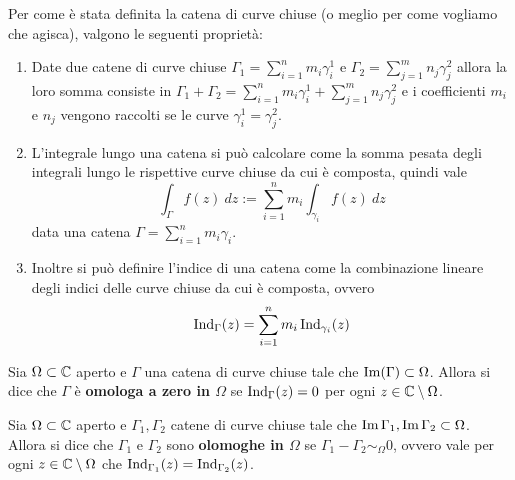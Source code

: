 \begin{remark}
  Per come è stata definita la catena di curve chiuse (o meglio per come vogliamo
  che agisca), valgono le seguenti proprietà:
  \begin{enumerate}
    \item Date due catene di curve chiuse $\Gamma_1 = \sum^n_{i=1} m_i
      \gamma^1_i$ e $\Gamma_2 = \sum^m_{j=1} n_j \gamma^2_j$ allora la loro
      somma consiste in $\Gamma_1 + \Gamma_2 =  \sum^n_{i=1} m_i
      \gamma^1_i + \sum^m_{j=1} n_j \gamma^2_j$ e i coefficienti $m_i$
      e $n_j$ vengono raccolti se le curve $\gamma^1_i = \gamma^2_j$.
    \item L'integrale lungo una catena si può calcolare come la somma pesata
      degli integrali lungo le rispettive curve chiuse da cui è composta,
      quindi vale 
      \begin{equation*}
        \int_\Gamma f(z)\ dz := \sum^n_{i=1} m_i \int_{\gamma_i} f(z)\ dz
      \end{equation*}
      data una catena $\Gamma = \sum^n_{i=1} m_i\gamma_i$.
    \item Inoltre si può definire l'indice di una catena come la
      combinazione lineare degli indici delle curve chiuse da cui
      è composta, ovvero 
      \begin{equation*}
        \operatorname{Ind}_\Gamma(z) = \sum^n_{i=1} m_i
        \operatorname{Ind}_{\gamma_i}(z)
      \end{equation*}
  \end{enumerate}
  \label{rmk:operazioni-intuitive-per-le-catene-di-curve-chiuse}
\end{remark}


\begin{definition}
  \label{def:omologia-a-zero}
  Sia $\Omega \subset \mathbb{C}$ aperto e $\Gamma$ una catena di curve chiuse tale
  che $\operatorname{Im}(\Gamma) \subset \Omega$. Allora si dice che $\Gamma$
  è \textbf{omologa a zero in $\Omega$} se $\operatorname{Ind}_\Gamma(z)
  = 0$ per ogni $z \in \mathbb{C} \setminus \Omega$. 
\end{definition}

\begin{definition}
  \label{def:omologia-tra-catene}
  Sia $\Omega \subset \mathbb{C}$ aperto e $\Gamma_1,\Gamma_2$ catene di curve 
  chiuse tale che $\operatorname{Im}{\Gamma_1}, \operatorname{Im}{\Gamma_2} \subset \Omega$. 
  Allora si dice che $\Gamma_1$ e $\Gamma_2$ sono \textbf{olomoghe in 
  $\Omega$} se $\Gamma_1 - \Gamma_2 \sim_\Omega 0$, ovvero vale per ogni $z
  \in \mathbb{C} \setminus \Omega$ che $\operatorname{Ind}_{\Gamma_1}(z)
  = \operatorname{Ind}_{\Gamma_2}(z)$.
\end{definition}

